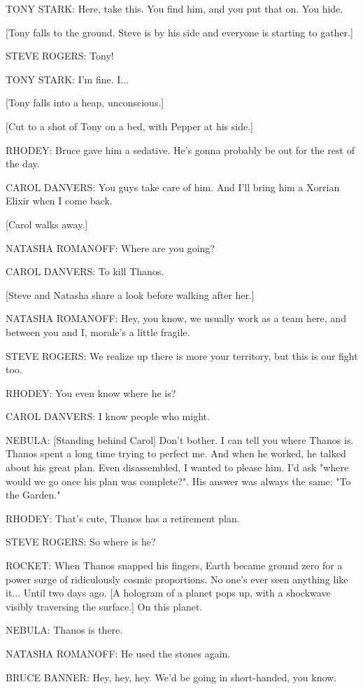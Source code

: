 TONY STARK: Here, take this. You find him, and you put that on. You hide.

[Tony falls to the ground. Steve is by his side and everyone is starting to gather.]

STEVE ROGERS: Tony!

TONY STARK: I'm fine. I...

[Tony falls into a heap, unconscious.]

[Cut to a shot of Tony on a bed, with Pepper at his side.]

RHODEY: Bruce gave him a sedative. He's gonna probably be out for the rest of the day.

CAROL DANVERS: You guys take care of him. And I'll bring him a Xorrian Elixir when I come back.

[Carol walks away.]

NATASHA ROMANOFF: Where are you going?

CAROL DANVERS: To kill Thanos.

[Steve and Natasha share a look before walking after her.]

NATASHA ROMANOFF: Hey, you know, we usually work as a team here, and between you and I, morale's a little fragile.

STEVE ROGERS: We realize up there is more your territory, but this is our fight too.

RHODEY: You even know where he is?

CAROL DANVERS: I know people who might.

NEBULA: [Standing behind Carol] Don't bother. I can tell you where Thanos is. Thanos spent a long time trying to perfect me. And when he worked, he talked about his great plan. Even disassembled, I wanted to please him. I'd ask "where would we go once his plan was complete?". His answer was always the same: "To the Garden."

RHODEY: That's cute, Thanos has a retirement plan.

STEVE ROGERS: So where is he?

ROCKET: When Thanos snapped his fingers, Earth became ground zero for a power surge of ridiculously cosmic proportions. No one's ever seen anything like it... Until two days ago. [A hologram of a planet pops up, with a shockwave visibly traversing the surface.] On this planet.

NEBULA: Thanos is there.

NATASHA ROMANOFF: He used the stones again.

BRUCE BANNER: Hey, hey, hey. We'd be going in short-handed, you know.

